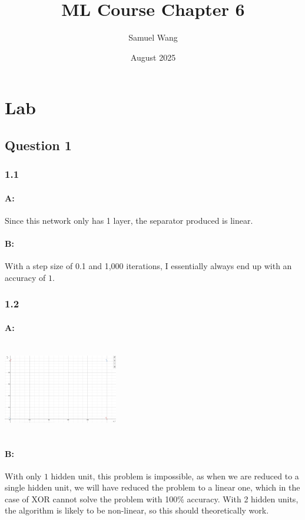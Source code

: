 \documentclass{article}
\title{ML Course Chapter 6}
\author{Samuel Wang}
\date{August 2025}
\begin{document}
\maketitle

\section{Lab}

\subsection{Question 1}

\subsubsection{1.1}

\paragraph{A: } Since this network only has 1 layer, the separator produced is linear.

\paragraph{B: } With a step size of 0.1 and 1,000 iterations, I essentially always end up with an accuracy of $1$.

\subsubsection{1.2}

\paragraph{A: } \includegraphics[width=5cm, height=4cm]{Week 6 graph.png}

\paragraph{B: } With only $1$ hidden unit, this problem is impossible, as when we are reduced to a single hidden unit, we will have reduced the problem to a linear one, which in the case of XOR cannot solve the problem with 100\% accuracy. With 2 hidden units, the algorithm is likely to be non-linear, so this should theoretically work.
\end{document}
